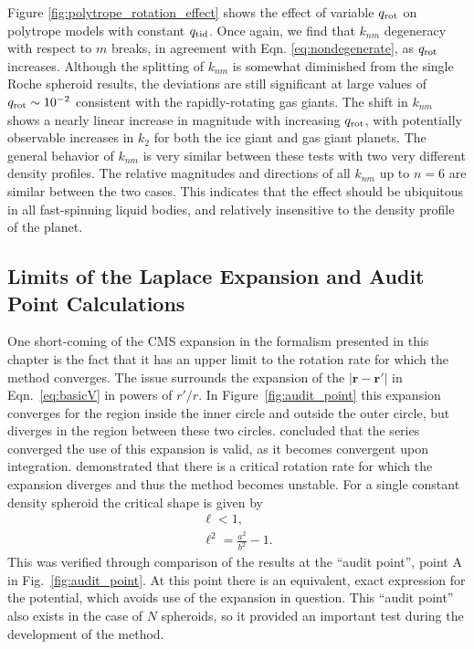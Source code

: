 Figure \ref{fig:polytrope_rotation_effect} shows the effect of variable $q_{\rm rot}$
on polytrope models with constant $q_{\rm tid}$. Once again, we find that $k_{nm}$
degeneracy with respect to $m$ breaks, in agreement with Eqn.
\eqref{eq:nondegenerate}, as $q_{\rm rot}$ increases. Although the splitting of
$k_{nm}$ is somewhat diminished from the single Roche spheroid results, the
deviations are still significant at large values of $q_{\rm rot}\sim 10^{-2}$
consistent with the rapidly-rotating gas giants. The shift in $k_{nm}$ shows a nearly
linear increase in magnitude with increasing $q_{\rm rot}$, with potentially
observable increases in $k_2$ for both the ice giant and gas giant planets. The
general behavior of $k_{nm}$ is very similar between these tests with two very
different density profiles. The relative magnitudes and directions of all $k_{nm}$ up
to $n=6$ are similar between the two cases. This indicates that the effect should be
ubiquitous in all fast-spinning liquid bodies, and relatively insensitive to the
density profile of the planet.

\subsection{Limits of the Laplace Expansion and Audit Point Calculations}\label{expansion}

One short-coming of the CMS expansion in the formalism presented in this chapter is
the fact that it has an upper limit to the rotation rate for which the method
converges. The issue surrounds the expansion of the
$\left|\mathbf{r}-\mathbf{r'}\right|$ in Eqn.~\ref{eq:basicV} in powers of $r'/r$. In
Figure~\ref{fig:audit_point} this expansion converges for the region inside the inner
circle and outside the outer circle, but diverges in the region between these two
circles. \citet{zharkov1978} concluded that the series converged the use of this
expansion is valid, as it becomes convergent upon integration. \citet{Hubbard2014}
demonstrated that there is a critical rotation rate for which the expansion diverges
and thus the method becomes unstable. For a single constant density spheroid the
critical shape is given by
%
\begin{equation}\label{eq:crit_ell}
\begin{aligned}
    \ell < 1, \\
    \ell^2 = \frac{a^2}{b^2}-1.
\end{aligned}
\end{equation}
%
This was verified through comparison of the results at the ``audit point'', point A in
Fig.~\ref{fig:audit_point}. At this point there is an equivalent, exact expression
for the potential, which avoids use of the expansion in question. This ``audit
point'' also exists in the case of $N$ spheroids, so it provided an important test during
the development of the method.

